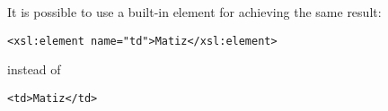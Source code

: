%
\begin{slide}

\raggedslides[0pt]

It is possible to use a built-in \XSLT element for achieving the same
result:
{\small
\begin{verbatim}
<xsl:element name="td">Matiz</xsl:element>
\end{verbatim}
}
\noindent instead of
{\small
\begin{verbatim}
<td>Matiz</td>
\end{verbatim}
}

\end{slide}

